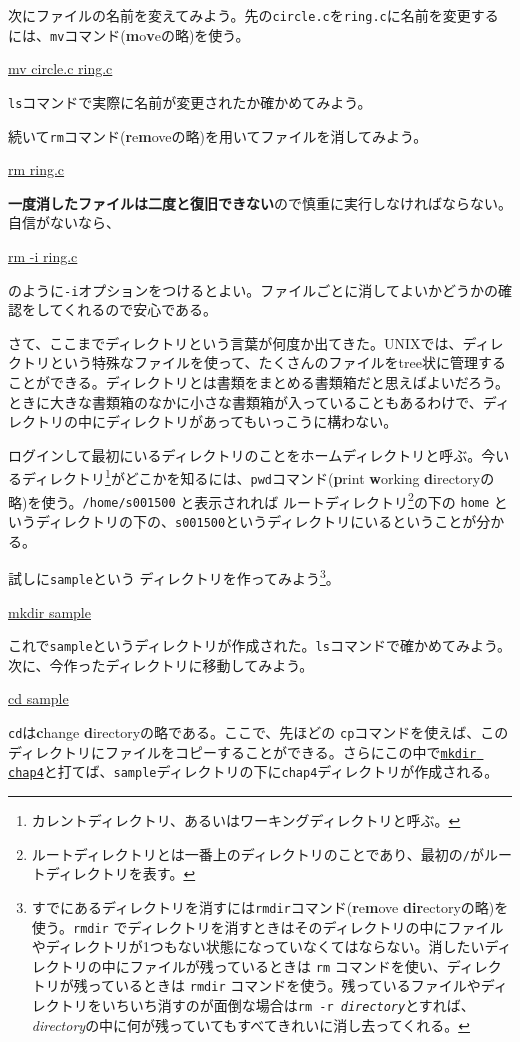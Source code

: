 次にファイルの名前を変えてみよう。先の{\tt circle.c}を{\tt ring.c}に名前を変更するには、{\tt mv}コマンド({\bf m}o{\bf v}eの略)を使う。
\begin{commandline2}
\prompt \underline{mv circle.c ring.c}
\end{commandline2} \noindent
{\tt ls}コマンドで実際に名前が変更されたか確かめてみよう。

続いて{\tt rm}コマンド({\bf r}e{\bf m}oveの略)を用いてファイルを消してみよう。
\begin{commandline2}
\prompt \underline{rm ring.c}
\end{commandline2} \noindent
{\bf 一度消したファイルは二度と復旧できない}ので慎重に実行しなければならない。自信がないなら、
\begin{commandline2}
\prompt \underline{rm -i ring.c}
\end{commandline2} \noindent
のように{\tt -i}オプションをつけるとよい。ファイルごとに消してよいかどうかの確認をしてくれるので安心である。

さて、ここまでディレクトリという言葉が何度か出てきた。UNIXでは、ディレクトリという特殊なファイルを使って、たくさんのファイルをtree状に管理することができる。ディレクトリとは書類をまとめる書類箱だと思えばよいだろう。ときに大きな書類箱のなかに小さな書類箱が入っていることもあるわけで、ディレクトリの中にディレクトリがあってもいっこうに構わない。

ログインして最初にいるディレクトリのことをホームディレクトリと呼ぶ。今いるディレクトリ\footnote{カレントディレクトリ、あるいはワーキングディレクトリと呼ぶ。}がどこかを知るには、{\tt pwd}コマンド({\bf p}rint {\bf w}orking {\bf d}irectoryの略)を使う。{\tt /home/s001500} と表示されれば ルートディレクトリ\footnote{ルートディレクトリとは一番上のディレクトリのことであり、最初の{\tt /}がルートディレクトリを表す。}の下の {\tt home} というディレクトリの下の、{\tt s001500}というディレクトリにいるということが分かる。

試しに{\tt sample}という ディレクトリを作ってみよう\footnote{すでにあるディレクトリを消すには{\tt rmdir}コマンド({\bf r}e{\bf m}ove {\bf dir}ectoryの略)を使う。{\tt rmdir} でディレクトリを消すときはそのディレクトリの中にファイルやディレクトリが1つもない状態になっていなくてはならない。消したいディレクトリの中にファイルが残っているときは {\tt rm} コマンドを使い、ディレクトリが残っているときは {\tt rmdir} コマンドを使う。残っているファイルやディレクトリをいちいち消すのが面倒な場合は{\tt rm -r {\it directory}}とすれば、{\it directory}の中に何が残っていてもすべてきれいに消し去ってくれる。}。
\begin{commandline2}
\prompt \underline{mkdir sample}
\end{commandline2} \noindent
これで{\tt sample}というディレクトリが作成された。{\tt ls}コマンドで確かめてみよう。次に、今作ったディレクトリに移動してみよう。
\begin{commandline2}
\prompt \underline{cd sample}
\end{commandline2} \noindent
{\tt cd}は{\bf c}hange {\bf d}irectoryの略である。ここで、先ほどの {\tt cp}コマンドを使えば、このディレクトリにファイルをコピーすることができる。さらにこの中で\underline{{\tt mkdir chap4}}と打てば、{\tt sample}ディレクトリの下に{\tt chap4}ディレクトリが作成される。

